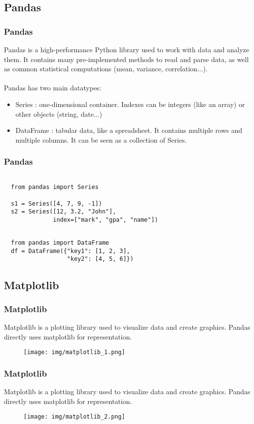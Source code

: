 \documentclass{beamer}
\begin{document}
\subsection{Pandas}
\begin{frame}
  \frametitle{Pandas}
  Pandas is a high-performance Python library used to work with data and analyze
  them. It contains many pre-implemented methods to read and parse data, as well
  as common statistical computations (mean, variance, correlation...).
  \\~\\

  Pandas has two main datatypes:
  \begin{itemize}
    \item Series : one-dimensional container. Indexes can be integers (like an
      array) or other objects (string, date...)
    \item DataFrame : tabular data, like a spreadsheet. It contains multiple
      rows and multiple columns. It can be seen as a collection of Series.
  \end{itemize}
\end{frame}

\begin{frame}[fragile]
  \frametitle{Pandas}
  \begin{example}[Series]
    \begin{verbatim}

  from pandas import Series

  s1 = Series([4, 7, 9, -1])
  s2 = Series([12, 3.2, "John"],
              index=["mark", "gpa", "name"])
    \end{verbatim}
  \end{example}

  \begin{example}[DataFrame]
    \begin{verbatim}

  from pandas import DataFrame
  df = DataFrame({"key1": [1, 2, 3],
                  "key2": [4, 5, 6]})
    \end{verbatim}
  \end{example}
\end{frame}

\subsection{Matplotlib}
\begin{frame}
  \frametitle{Matplotlib}
  Matplotlib is a plotting library used to visualize data and create graphics.
  Pandas directly uses matplotlib for representation.
  \begin{figure}[h]
    \texttt{[image: img/matplotlib\_1.png]}
  \end{figure}
\end{frame}

\begin{frame}
  \frametitle{Matplotlib}
  Matplotlib is a plotting library used to visualize data and create graphics.
  Pandas directly uses matplotlib for representation.
  \begin{figure}[h]
    \texttt{[image: img/matplotlib\_2.png]}
  \end{figure}
\end{frame}
\end{document}
